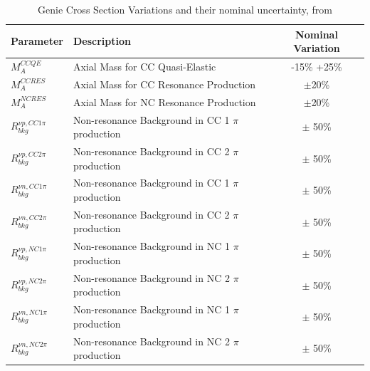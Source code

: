 {
\renewcommand{\arraystretch}{1.5}
\begin{table}[tb]
  \caption[Genie Cross Section Variations]{Genie Cross Section Variations and their nominal uncertainty, from \cite{Genie_manual}}
  \label{tab:genie_xsec_params}
  \centering

  \begin{tabular}{l|lc}
  \hline

  \hline
  \textbf{Parameter} & \textbf{Description} & \textbf{Nominal Variation} \\
  \hline
     $M_A^{CCQE}$ & Axial Mass for CC Quasi-Elastic & -15\% +25\%  \\
     $M_A^{CCRES}$ & Axial Mass for CC Resonance Production & $\pm$20\%  \\
     $M_A^{NCRES}$ & Axial Mass for NC Resonance Production & $\pm$20\%  \\
     $R_{bkg}^{\nu p, CC 1 \pi}$& Non-resonance Background in CC 1 $\pi$ production & $\pm$ 50\% \\
     $R_{bkg}^{\nu p, CC 2 \pi}$& Non-resonance Background in CC 2 $\pi$ production & $\pm$ 50\% \\
     $R_{bkg}^{\nu n, CC 1 \pi}$& Non-resonance Background in CC 1 $\pi$ production & $\pm$ 50\% \\
     $R_{bkg}^{\nu n, CC 2 \pi}$& Non-resonance Background in CC 2 $\pi$ production & $\pm$ 50\% \\
     $R_{bkg}^{\nu p, NC 1 \pi}$& Non-resonance Background in NC 1 $\pi$ production & $\pm$ 50\% \\
     $R_{bkg}^{\nu p, NC 2 \pi}$& Non-resonance Background in NC 2 $\pi$ production & $\pm$ 50\% \\
     $R_{bkg}^{\nu n, NC 1 \pi}$& Non-resonance Background in NC 1 $\pi$ production & $\pm$ 50\% \\
     $R_{bkg}^{\nu n, NC 2 \pi}$& Non-resonance Background in NC 2 $\pi$ production & $\pm$ 50\% \\
  \hline

  \hline
  \end{tabular}
\end{table}
}


